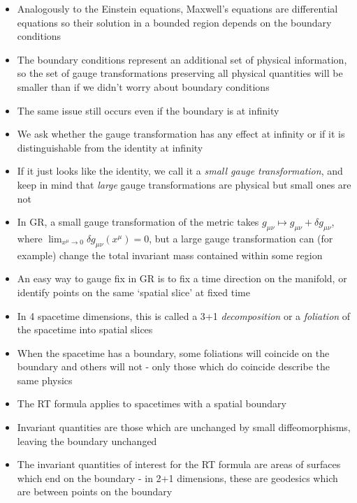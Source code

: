 \documentclass[12pt,a4paper]{article}
\numberwithin{equation}{section}
\begin{document}
\begin{itemize}
		\item Analogously to the Einstein equations, Maxwell's equations are differential equations so their solution in a bounded region depends on the boundary conditions
		\item The boundary conditions represent an additional set of physical information, so the set of gauge transformations preserving all physical quantities will be smaller than if we didn't worry about boundary conditions
		\item The same issue still occurs even if the boundary is at infinity
		\item We ask whether the gauge transformation has any effect at infinity or if it is distinguishable from the identity at infinity
		\item If it just looks like the identity, we call it a \textit{small gauge transformation}, and keep in mind that \textit{large} gauge transformations are physical but small ones are not
		\item In GR, a small gauge transformation of the metric takes $g_{\mu\nu}\mapsto g_{\mu\nu}+\delta g_{\mu\nu}$, where $\lim_{x^{\mu}\to 0}\delta g_{\mu\nu}(x^{\mu})=0$, but a large gauge transformation can (for example) change the total invariant mass contained within some region
		\item An easy way to gauge fix in GR is to fix a time direction on the manifold, or identify points on the same `spatial slice' at fixed time
		\item In 4 spacetime dimensions, this is called a 3+1 \textit{decomposition} or a \textit{foliation} of the spacetime into spatial slices
		\item When the spacetime has a boundary, some foliations will coincide on the boundary and others will not - only those which do coincide describe the same physics
		\item The RT formula applies to spacetimes with a spatial boundary
		\item Invariant quantities are those which are unchanged by small diffeomorphisms, leaving the boundary unchanged
		\item The invariant quantities of interest for the RT formula are areas of surfaces which end on the boundary - in 2+1 dimensions, these are geodesics which are between points on the boundary
	\end{itemize}
\end{document}
